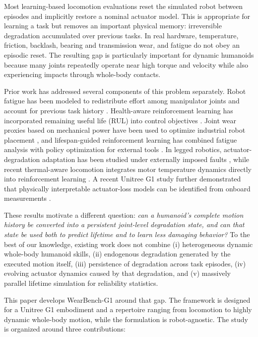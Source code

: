 \documentclass[letterpaper,10pt,conference]{ieeeconf}
\begin{document}
Most learning-based locomotion evaluations reset the simulated robot between episodes and implicitly restore a nominal actuator model. This is appropriate for learning a task but removes an important physical memory: irreversible degradation accumulated over previous tasks. In real hardware, temperature, friction, backlash, bearing and transmission wear, and fatigue do not obey an episodic reset. The resulting gap is particularly important for dynamic humanoids because many joints repeatedly operate near high torque and velocity while also experiencing impacts through whole-body contacts.

Prior work has addressed several components of this problem separately. Robot fatigue has been modeled to redistribute effort among manipulator joints and account for previous task history \cite{lamon2018fatigue}. Health-aware reinforcement learning has incorporated remaining useful life (RUL) into control objectives \cite{jha2020health}. Joint wear proxies based on mechanical power have been used to optimize industrial robot placement \cite{kot2021wear}, and lifespan-guided reinforcement learning has combined fatigue analysis with policy optimization for external tools \cite{wu2025tool}. In legged robotics, actuator-degradation adaptation has been studied under externally imposed faults \cite{wu2023adapt}, while recent thermal-aware locomotion integrates motor temperature dynamics directly into reinforcement learning \cite{qian2026thermal}. A recent Unitree G1 study further demonstrated that physically interpretable actuator-loss models can be identified from onboard measurements \cite{deniz2026g1}.

These results motivate a different question: \emph{can a humanoid's complete motion history be converted into a persistent joint-level degradation state, and can that state be used both to predict lifetime and to learn less damaging behavior?} To the best of our knowledge, existing work does not combine (i) heterogeneous dynamic whole-body humanoid skills, (ii) endogenous degradation generated by the executed motion itself, (iii) persistence of degradation across task episodes, (iv) evolving actuator dynamics caused by that degradation, and (v) massively parallel lifetime simulation for reliability statistics.

This paper develops WearBench-G1 around that gap. The framework is designed for a Unitree G1 embodiment and a repertoire ranging from locomotion to highly dynamic whole-body motion, while the formulation is robot-agnostic. The study is organized around three contributions:
\end{document}
